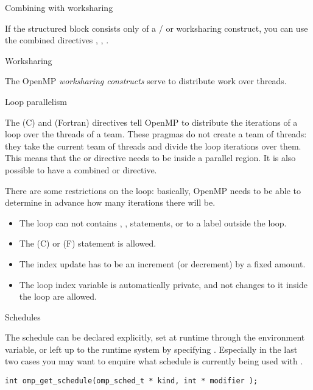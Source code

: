 
 {Combining with worksharing}

If the structured block consists only of a / or  worksharing construct,
you can use the combined directives
,
,
.

 {Worksharing}

The OpenMP \emph{worksharing constructs} serve to distribute work
over threads.

 {Loop parallelism}

The  (C) and  (Fortran) directives
tell OpenMP to distribute the iterations of a loop over the threads
of a team.
These pragmas do not create a team of threads: they
take the current team of threads and divide the loop iterations over them.
This means that the  or  directive needs to be
inside a parallel region. It is also possible to have a combined
 or  directive.

There are some restrictions on the loop: basically, OpenMP needs to be
able to determine in advance how many iterations there will be.
\begin{itemize}
\item The loop can not contains , ,  statements, or
   to a label outside the loop.
\item The  (C) or  (F) statement is allowed.
\item The index update has to be an increment (or decrement) by a fixed amount.
\item The loop index variable is automatically private, and not changes to it
  inside the loop are allowed.
\end{itemize}

 {Schedules}

The schedule can be declared explicitly, set at runtime
through the  environment variable, or left up to the runtime system
by specifying . Especially in the last two cases  you may want to enquire
what schedule is currently being used with
.
\begin{verbatim}
int omp_get_schedule(omp_sched_t * kind, int * modifier );
\end{verbatim}

